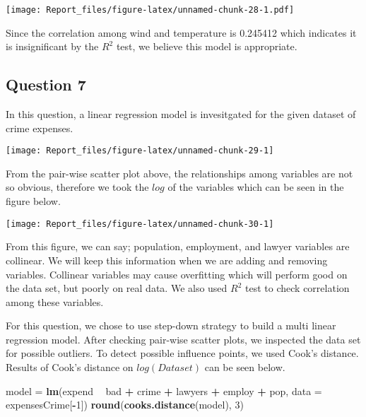\documentclass[]{article}
\newenvironment{Shaded}{\begin{snugshade}}{\end{snugshade}}
\newcommand{\KeywordTok}[1]{\textcolor[rgb]{0.13,0.29,0.53}{\textbf{#1}}}
\newcommand{\DataTypeTok}[1]{\textcolor[rgb]{0.13,0.29,0.53}{#1}}
\newcommand{\DecValTok}[1]{\textcolor[rgb]{0.00,0.00,0.81}{#1}}
\newcommand{\StringTok}[1]{\textcolor[rgb]{0.31,0.60,0.02}{#1}}
\newcommand{\OperatorTok}[1]{\textcolor[rgb]{0.81,0.36,0.00}{\textbf{#1}}}
\newcommand{\NormalTok}[1]{#1}
\begin{document}
\texttt{[image: Report\_files/figure-latex/unnamed-chunk-28-1.pdf]}

Since the correlation among wind and temperature is 0.245412 which
indicates it is insignificant by the \(R^2\) test, we believe this model
is appropriate.

\subsection{Question 7}\label{question-7}

In this question, a linear regression model is invesitgated for the
given dataset of crime expenses.

\begin{center}\texttt{[image: Report\_files/figure-latex/unnamed-chunk-29-1]} \end{center}

From the pair-wise scatter plot above, the relationships among variables
are not so obvious, therefore we took the \(log\) of the variables which
can be seen in the figure below.

\begin{center}\texttt{[image: Report\_files/figure-latex/unnamed-chunk-30-1]} \end{center}

From this figure, we can say; population, employment, and lawyer
variables are collinear. We will keep this information when we are
adding and removing variables. Collinear variables may cause overfitting
which will perform good on the data set, but poorly on real data. We
also used \(R^2\) test to check correlation among these variables.

For this question, we chose to use step-down strategy to build a multi
linear regression model. After checking pair-wise scatter plots, we
inspected the data set for possible outliers. To detect possible
influence points, we used Cook's distance. Results of Cook's distance on
\(log(Dataset)\) can be seen below.

\begin{Shaded}
\begin{Highlighting}[]
\NormalTok{model =}\StringTok{ }\KeywordTok{lm}\NormalTok{(expend }\OperatorTok{~}\StringTok{ }\NormalTok{bad }\OperatorTok{+}\StringTok{ }\NormalTok{crime }\OperatorTok{+}\StringTok{ }\NormalTok{lawyers }\OperatorTok{+}\StringTok{ }\NormalTok{employ }\OperatorTok{+}\StringTok{ }\NormalTok{pop, }\DataTypeTok{data =}\NormalTok{ expensesCrime[}\OperatorTok{-}\DecValTok{1}\NormalTok{])}
\KeywordTok{round}\NormalTok{(}\KeywordTok{cooks.distance}\NormalTok{(model), }\DecValTok{3}\NormalTok{)}
\end{Highlighting}
\end{Shaded}
\end{document}
